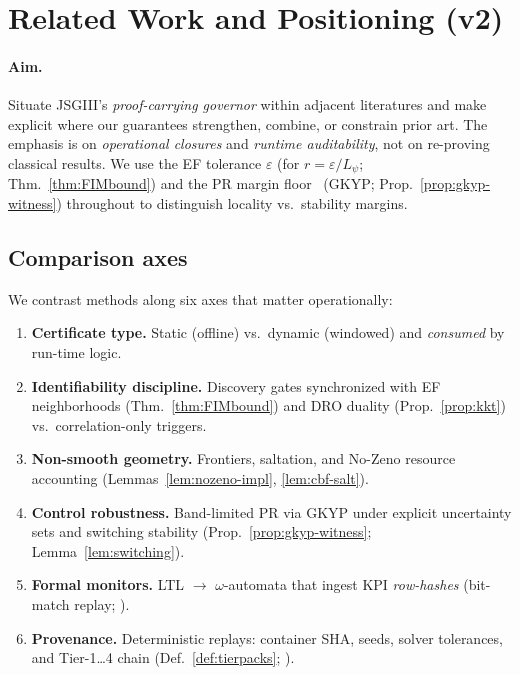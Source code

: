 \section{Related Work and Positioning (v2)}\label{sec:related-v2}

\paragraph{Aim.}
Situate JSGIII’s \emph{proof-carrying governor} within adjacent literatures and make explicit where our guarantees strengthen, combine, or constrain prior art. The emphasis is on \emph{operational closures} and \emph{runtime auditability}, not on re-proving classical results. We use the EF tolerance $\varepsilon$ (for $r=\varepsilon/L_\psi$; Thm.~\ref{thm:FIMbound}) and the PR margin floor \constsymPRmargin\ (GKYP; Prop.~\ref{prop:gkyp-witness}) throughout to distinguish locality vs.\ stability margins.

\subsection{Comparison axes}\label{subsec:rel-axes}
\emph{}
We contrast methods along six axes that matter operationally:
\begin{enumerate}[leftmargin=*]
\item \textbf{Certificate type.} Static (offline) vs.\ dynamic (windowed) and \emph{consumed} by run-time logic.
\item \textbf{Identifiability discipline.} Discovery gates synchronized with EF neighborhoods (Thm.~\ref{thm:FIMbound}) and DRO duality (Prop.~\ref{prop:kkt}) vs.\ correlation-only triggers.
\item \textbf{Non-smooth geometry.} Frontiers, saltation, and No-Zeno resource accounting (Lemmas~\ref{lem:nozeno-impl}, \ref{lem:cbf-salt}).
\item \textbf{Control robustness.} Band-limited PR via GKYP under explicit uncertainty sets and switching stability (Prop.~\ref{prop:gkyp-witness}; Lemma~\ref{lem:switching}).
\item \textbf{Formal monitors.} LTL $\to$ $\omega$-automata that ingest KPI \emph{row-hashes} (bit-match replay; ).
\item \textbf{Provenance.} Deterministic replays: container SHA, seeds, solver tolerances, and Tier-1…4 chain (Def.~\ref{def:tierpacks}; ).
\end{enumerate}

